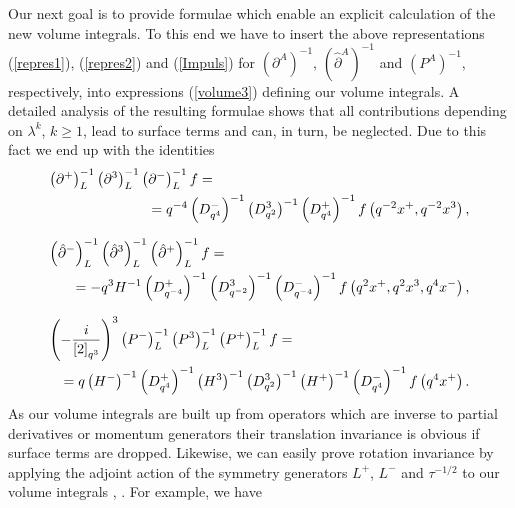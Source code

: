 \documentclass[a4paper,11pt,oneside]{article}
\begin{document}
Our next goal is to provide formulae which enable an explicit
calculation of the new volume integrals. To this end we have to insert the
above representations (\ref{repres1}), (\ref{repres2}) and (\ref{Impuls})
for $\left( \partial ^{A}\right) ^{-1}$, $\left( \hat{\partial}^{A}\right)
^{-1}$ and $\left( P^{A}\right) ^{-1}$, respectively, into 
expressions (\ref{volume3}) defining our volume integrals. A detailed
analysis of the resulting formulae shows that all contributions
depending on $\lambda ^{k}$, $k\geq 1$, lead to surface terms and can, in
turn, be neglected. Due to this fact we end up with the identities 
\begin{eqnarray}
\lefteqn{\left( \partial ^{+}\right) _{L}^{-1}\left( \partial ^{3}\right)
_{L}^{-1}\left( \partial ^{-}\right) _{L}^{-1}f =} \\
&&\hspace*{0 cm}=q^{-4}\left( D_{q^{4}}^{-}\right) ^{-1}\left(
D_{q^{2}}^{3}\right) ^{-1}\left( D_{q^{4}}^{+}\right) ^{-1}f\left(
q^{-2}x^{+},q^{-2}x^{3}\right) ,  \nonumber \\[0.1in]
\lefteqn{ \left( \hat{\partial}^{-}\right) _{L}^{-1}\left( \hat{\partial}^{3}\right)
_{L}^{-1}\left( \hat{\partial}^{+}\right) _{L}^{-1}f =}  \nonumber \\
&&\hspace*{0 cm}=-q^{3}H^{-1}\left( D_{q^{-4}}^{+}\right) ^{-1}\left(
D_{q^{-2}}^{3}\right) ^{-1}\left( D_{q^{-4}}^{-}\right) ^{-1}f\left(
q^{2}x^{+},q^{2}x^{3},q^{4}x^{-}\right) ,  \nonumber \\[0.1in]
\lefteqn{\left( -\frac{i}{\left[ 2\right] _{q^{3}}}\right) ^{3}\left( P^{-}\right)
_{L}^{-1}\left( P^{3}\right) _{L}^{-1}\left( P^{+}\right) _{L}^{-1}f =}& 
\nonumber \\
&&\hspace*{0 cm}=q\left( H^{-}\right) ^{-1}\left( D_{q^{4}}^{+}\right)
^{-1}\left( H^{3}\right) ^{-1}\left( D_{q^{2}}^{3}\right) ^{-1}\left(
H^{+}\right) ^{-1}\left( D_{q^{4}}^{-}\right) ^{-1}f\left( q^{4}x^{+}\right)
.  \nonumber
\end{eqnarray}
As our volume integrals are built up from operators which are inverse to
partial derivatives or momentum generators their translation invariance is
obvious if surface terms are dropped. Likewise, we can easily prove
rotation invariance by applying the adjoint action of the symmetry
generators $L^{+}$, $L^{-}$ and $\tau ^{-1/2}$ to our volume integrals \cite
{KS97}, \cite{Maj95}. For example, we have 
\end{document}
